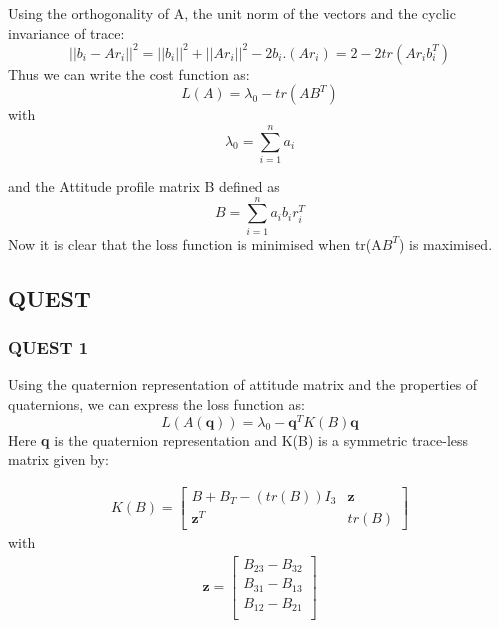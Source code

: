 \documentclass[../../main.tex]{subfiles}
\begin{document}
{{{Using the orthogonality of A, the unit norm of the vectors and the cyclic invariance of trace:
\begin{equation}
||b_{i}-Ar_{i}||^2 = ||b_{i}||^2 + ||Ar_{i}||^2 -2b_{i}.(Ar_{i}) = 2- 2 tr(Ar_{i}b_{i}^{T})
\end{equation}
Thus we can write the cost function as:
\begin{equation}
    L(A)= \lambda _{0} - tr(AB^{T})
\end{equation}
with
\begin{equation}
    \lambda_{0}= \sum_{i=1}^{n} a_{i}
\end{equation}

and the Attitude profile matrix B defined as 
\begin{equation}
    B= \sum_{i=1}^{n} a_{i} b_{i} r_{i}^{T}
\end{equation}
Now it is clear that the loss function is minimised when tr(A$B^T$) is maximised.

}



}

\subsection{QUEST}
{
\subsubsection{QUEST 1}
{
Using the quaternion representation of attitude matrix and the properties of quaternions, we can express the loss function as:
\begin{equation}
    L(A(\textbf{q}))= \lambda_{0}- \textbf{q}^{T} K(B) \textbf{q}
\end{equation}
Here \textbf{q} is the quaternion representation and K(B) is a symmetric trace-less matrix given by:

\begin{align}
 K(B)=
  \begin{bmatrix}
  B+ B_{T}- (tr(B)) I_{3} &  \mathbf{z}  \\
  \mathbf{z}^{T} & tr(B)
  \end{bmatrix}
\end{align}
with
\begin{align}
\mathbf{z}=
\begin{bmatrix}
B_{23}-B_{32} \\
B_{31}-B_{13} \\
B_{12}-B_{21} \\
\end{bmatrix}
\end{align}

}}}
\end{document}
